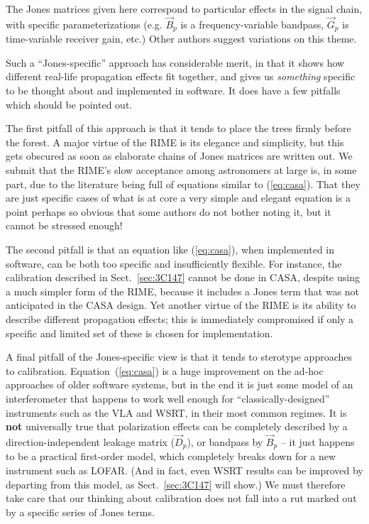 \documentclass[]{aa}
\newcommand{\jones}[2]{\vec {#1}_{#2}}
\begin{document}
The Jones matrices given here correspond to particular effects in the signal chain, with specific parameterizations (e.g. $\jones{B}{p}$ is a frequency-variable bandpass, $\jones{G}{p}$ is time-variable receiver gain, etc.) Other authors \citep{Rau:DDEs} suggest variations on this theme. 

Such a ``Jones-specific'' approach has considerable merit, in that it shows how different real-life propagation effects fit together, and gives us {\em something} specific to be thought about and implemented in software. It does have a few pitfalls which should be pointed out.

The first pitfall of this approach is that it tends to place the trees firmly before the forest. A major virtue of the RIME is its elegance and simplicity, but this gets obscured as soon as elaborate chains of Jones matrices are written out.  We submit that the RIME's slow acceptance among astronomers at large is, in some part, due to the literature being full of equations similar to (\ref{eq:casa}). That they are just specific cases of what is at core a very simple and elegant equation is a point perhaps so obvious that some authors do not bother noting it, but it cannot be stressed enough!

The second pitfall is that an equation like (\ref{eq:casa}), when implemented in software, can be both too specific and insufficiently flexible. For instance, the calibration described in Sect.~\ref{sec:3C147} cannot be done in CASA, despite using a much simpler form of the RIME, because it includes a Jones term that was not anticipated in the CASA design. Yet another virtue of the RIME is its ability to describe different propagation effects; this is immediately compromised if only a specific and limited set of these is chosen for implementation.

A final pitfall of the Jones-specific view is that it tends to sterotype approaches to calibration. Equation~(\ref{eq:casa}) is a huge improvement on the ad-hoc approaches of older software systems, but in the end it is just some model of an interferometer that happens to work well enough for ``classically-designed'' instruments such as the VLA and WSRT, in their most common regimes. It is {\bf not} universally true that polarization effects can be completely described by a direction-independent leakage matrix ($\jones{D}{p}$), or bandpass by $\jones{B}{p}$ -- it just happens to be a practical first-order model, which completely breaks down for a new instrument such as LOFAR. (And in fact, even WSRT results can be improved by departing from this model, as Sect.~\ref{sec:3C147} will show.) We must therefore take care that our thinking about calibration does not fall into a rut marked out by a specific series of Jones terms.
\end{document}
